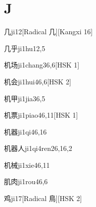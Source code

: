 
\section*{J}

\begin{entry}{几}{ji1}{2}[Radical 几][Kangxi 16]
\end{entry}

\begin{entry}{几乎}{ji1hu1}{2,5}
\end{entry}

\begin{entry}{机场}{ji1chang3}{6,6}[HSK 1]
\end{entry}

\begin{entry}{机会}{ji1hui4}{6,6}[HSK 2]
\end{entry}

\begin{entry}{机甲}{ji1jia3}{6,5}
\end{entry}

\begin{entry}{机票}{ji1piao4}{6,11}[HSK 1]
\end{entry}

\begin{entry}{机器}{ji1qi4}{6,16}
\end{entry}

\begin{entry}{机器人}{ji1qi4ren2}{6,16,2}
\end{entry}

\begin{entry}{机械}{ji1xie4}{6,11}
\end{entry}

\begin{entry}{肌肉}{ji1rou4}{6,6}
\end{entry}

\begin{entry}{鸡}{ji1}{7}[Radical 鳥][HSK 2]
\end{entry}

